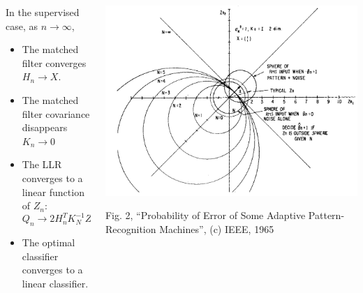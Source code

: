 \documentclass{beamer}
\begin{document}
\begin{frame}
  \begin{columns}
    \begin{column}{0.4\textwidth}
      In the supervised case, as $n\rightarrow\infty$,
      \begin{itemize}
      \item The matched filter converges $H_n\rightarrow X$.
      \item The matched filter covariance disappears $K_n\rightarrow 0$
      \item The LLR converges to a linear function of $Z_n$:
        \begin{displaymath}
          Q_n \rightarrow 2H_n^TK_N^{-1}Z_n - \text{constant}
        \end{displaymath}
      \item The optimal classifier converges to a linear classifier.
      \end{itemize}
    \end{column}
    \begin{column}{0.6\textwidth}
      \begin{center}
        \includegraphics[width=\textwidth]{figs/scudder1965fig2.png}

        \begin{tiny}
          Fig. 2, ``Probability of Error of Some Adaptive
          Pattern-Recognition Machines'', (c) IEEE, 1965
        \end{tiny}
      \end{center}
    \end{column}
  \end{columns}
\end{frame}
\end{document}
